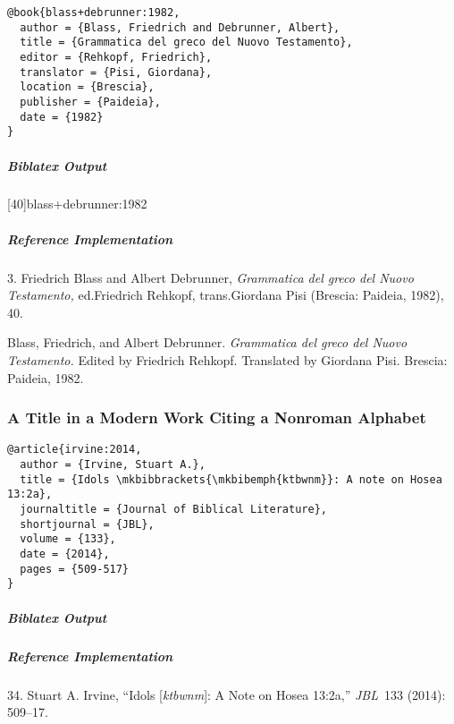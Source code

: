 \documentclass[a4paper]{article}
\newenvironment{biboutput}{%
  \subparagraph{Biblatex Output}
}{\color{black}}
\newenvironment{refimp}{%
  \subparagraph{Reference Implementation}
  \color{reference-colour}
  \rm
}{\par\color{black}}
\begin{document}
\begin{lstlisting}
@book{blass+debrunner:1982,
  author = {Blass, Friedrich and Debrunner, Albert},
  title = {Grammatica del greco del Nuovo Testamento},
  editor = {Rehkopf, Friedrich},
  translator = {Pisi, Giordana},
  location = {Brescia},
  publisher = {Paideia},
  date = {1982}
}
\end{lstlisting}  

\begin{biboutput}
  [40]{blass+debrunner:1982}
\end{biboutput}

\begin{refimp}
  \hspace*{\bibindent}3. Friedrich Blass and Albert Debrunner,
  \emph{Grammatica del greco del Nuovo Testamento,} ed.\@ Friedrich Rehkopf,
  trans.\@ Giordana Pisi (Brescia: Paideia, 1982), 40.

  \hangindent\bibindent Blass, Friedrich, and Albert Debrunner.
  \emph{Grammatica del greco del Nuovo Testamento.} Edited by Friedrich
  Rehkopf. Translated by Giordana Pisi. Brescia: Paideia, 1982.
\end{refimp}

\subsubsection{A Title in a Modern Work Citing a Nonroman Alphabet}

\begin{lstlisting}
@article{irvine:2014,
  author = {Irvine, Stuart A.},
  title = {Idols \mkbibbrackets{\mkbibemph{ktbwnm}}: A note on Hosea 13:2a},
  journaltitle = {Journal of Biblical Literature},
  shortjournal = {JBL},
  volume = {133},
  date = {2014},
  pages = {509-517}
}
\end{lstlisting}

\begin{biboutput}
\end{biboutput}

\begin{refimp}
  \hspace*{\bibindent}34. Stuart A. Irvine, “Idols [\emph{ktbwnm}]: A Note on
  Hosea 13:2a,” \emph{JBL}~133 (2014): 509–17.

\end{refimp}
\end{document}
